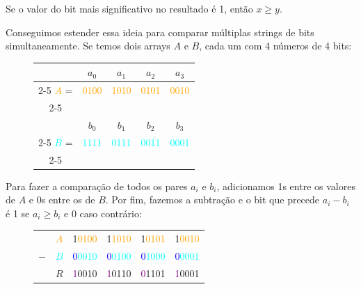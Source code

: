 Se o valor do bit mais significativo no resultado é 1, então $x\geq y$. 

Conseguimos estender essa ideia para comparar múltiplas strings de bits
simultaneamente. Se temos dois arrays $A$ e $B$, cada um com 4 números de 4
bits:

\enlargethispage{2\baselineskip}

\begin{figure}[h]
\bf \Large \centering
\begin{tabular}{ccccc}
& $a_0$ & $a_1$ & $a_2$ & $a_3$ \\
\cline{2-5}
\textcolor{Orange}{$A$} = &
\multicolumn{1}{|c}{\textcolor{orange}{0100}} &
\textcolor{orange}{1010} &
\textcolor{orange}{0101} &
 \multicolumn{1}{c|}{\textcolor{orange}{0010}} \\
\cline{2-5} 
\hfill \\
& $b_0$ & $b_1$ & $b_2$ & $b_3$ \\
\cline{2-5}
\textcolor{cyan}{$B$} = &
\multicolumn{1}{|c}{\textcolor{cyan}{1111}} &
\textcolor{cyan}{0111} &
\textcolor{cyan}{0011} &
\multicolumn{1}{c|}{\textcolor{cyan}{0001}} \\
\cline{2-5}
\end{tabular}
\end{figure}

Para fazer a comparação de todos os pares $a_i$ e $b_i$, adicionamos 1s entre os
valores de $A$ e 0s entre os de $B$. Por fim, fazemos a subtração e o bit que
precede $a_i-b_i$ é 1 se $a_i\geq b_i$ e 0 caso contrário:

\begin{figure}[h]
\bf \Large \centering
\begin{tabular}{cccccc}
& \textcolor{Orange}{$A$} &
\textcolor{RawSienna}{1}\textcolor{orange}{0100} & \textcolor{RawSienna}{1}\textcolor{orange}{1010} & \textcolor{RawSienna}{1}\textcolor{orange}{0101} & \textcolor{RawSienna}{1}\textcolor{orange}{0010} \\
$-$ & \textcolor{cyan}{$B$} &
\textcolor{blue}{0}\textcolor{cyan}{0010} &
\textcolor{blue}{0}\textcolor{cyan}{0100} &
\textcolor{blue}{0}\textcolor{cyan}{1000} &
\textcolor{blue}{0}\textcolor{cyan}{0001} \\
\hline
& \textcolor{CarnationPink}{$R$} &
\textcolor{Purple}{1}\textcolor{CarnationPink}{0010} &
\textcolor{Purple}{1}\textcolor{CarnationPink}{0110} &
\textcolor{Purple}{0}\textcolor{CarnationPink}{1101} &
\textcolor{Purple}{1}\textcolor{CarnationPink}{0001} 
\end{tabular}
\end{figure}

